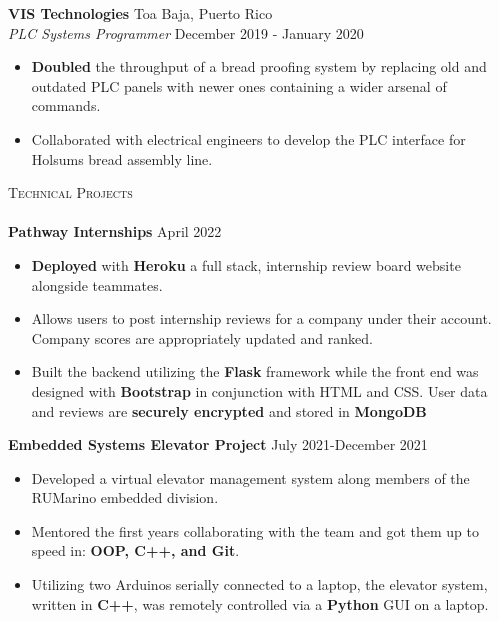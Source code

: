 \documentclass[a4paper]{article}
\newcommand{\lineunder} {
    \vspace*{-8pt} \\
    \hspace*{-18pt} \hrulefill \\
}
\newcommand{\header} [1] {
    {\hspace*{-18pt}\vspace*{6pt} \textsc{#1}}
    \vspace*{-6pt} \lineunder
}
\begin{document}
\textbf{VIS Technologies} \hfill Toa Baja, Puerto Rico\\
\textit{PLC Systems Programmer} \hfill December 2019 - January 2020\\
\vspace{-2mm}
\begin{itemize} \itemsep -1pt
	\item \textbf{Doubled} the throughput of a bread proofing system by replacing old and outdated PLC panels with newer ones containing a wider arsenal of commands.
	\item Collaborated with electrical engineers to develop the PLC interface for Holsum\textquotesingle{}s bread assembly line.
\end{itemize}

\header{Technical Projects}
{\textbf{Pathway Internships}} \hfill April 2022 \\
\vspace{-1mm}

\begin{itemize} \itemsep -1pt
\item \textbf{Deployed} with \textbf{Heroku} a full stack, internship review board website alongside teammates.

\item Allows users to post internship reviews for a company under their account. Company scores are appropriately updated and ranked.

\item Built the backend utilizing the \textbf{Flask} framework while the front end was designed with \textbf{Bootstrap} in conjunction with HTML and CSS. User data and reviews are \textbf{securely encrypted} and stored in \textbf{MongoDB}
\end{itemize}

{\textbf{Embedded Systems Elevator Project}} \hfill \hfill July 2021-December 2021\\
\vspace{-1mm}

\begin{itemize} \itemsep -1pt
\item Developed a virtual elevator management system along members of the RUMarino embedded division.

\item Mentored the first years collaborating with the team and got them up to speed in: \textbf{OOP, C++, and Git}.

\item Utilizing two Arduinos serially connected to a laptop, the elevator system, written in \textbf{C++}, was remotely controlled via a \textbf{Python} GUI on a laptop.\\
\vspace*{-0.5mm}
\end{itemize}
\end{document}
